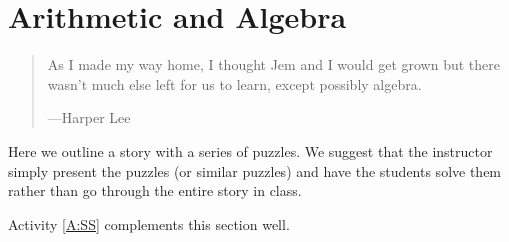\chapter{Arithmetic and Algebra}

\begin{quote}
As I made my way home, I thought Jem and I would get grown but there
wasn't much else left for us to learn, except possibly algebra.

\hfill---Harper Lee
\end{quote}

\begin{teachingnote}
Here we outline a story with a series of puzzles. We suggest that the
instructor simply present the puzzles (or similar puzzles) and have
the students solve them rather than go through the entire story in class.
\end{teachingnote}


\begin{activitynote}
Activity \ref{A:SS} complements this section well.  %
\end{activitynote}

